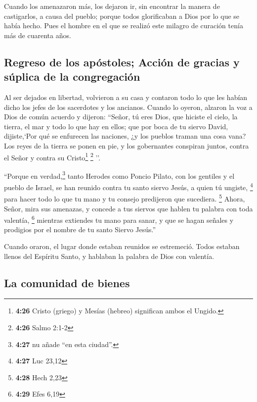  Cuando los amenazaron más, los dejaron ir, sin encontrar
la manera de castigarlos, a causa del pueblo; porque todos glorificaban
a Dios por lo que se había hecho.  Pues el hombre en el
que se realizó este milagro de curación tenía más de cuarenta años.

\hypertarget{regreso-de-los-apuxf3stoles-acciuxf3n-de-gracias-y-suxfaplica-de-la-congregaciuxf3n}{%
\subsection{Regreso de los apóstoles; Acción de gracias y súplica de la
congregación}\label{regreso-de-los-apuxf3stoles-acciuxf3n-de-gracias-y-suxfaplica-de-la-congregaciuxf3n}}

 Al ser dejados en libertad, volvieron a su casa y
contaron todo lo que les habían dicho los jefes de los sacerdotes y los
ancianos.  Cuando lo oyeron, alzaron la voz a Dios de
común acuerdo y dijeron: ``Señor, tú eres Dios, que hiciste el cielo, la
tierra, el mar y todo lo que hay en ellos;  que por boca
de tu siervo David, dijiste,`Por qué se enfurecen las naciones, ¿y los
pueblos traman una cosa vana?  Los reyes de la tierra se
ponen en pie, y los gobernantes conspiran juntos, contra el Señor y
contra su Cristo\footnote{\textbf{4:26} Cristo (griego) y Mesías
  (hebreo) significan ambos el Ungido.} \footnote{\textbf{4:26} Salmo
  2:1-2} ''.

 ``Porque en verdad,\footnote{\textbf{4:27} nu añade ``en
  esta ciudad''.} tanto Herodes como Poncio Pilato, con los gentiles y
el pueblo de Israel, se han reunido contra tu santo siervo Jesús, a
quien tú ungiste, \footnote{\textbf{4:27} Luc 23,12} 
para hacer todo lo que tu mano y tu consejo predijeron que sucediera.
\footnote{\textbf{4:28} Hech 2,23}  Ahora, Señor, mira
sus amenazas, y concede a tus siervos que hablen tu palabra con toda
valentía, \footnote{\textbf{4:29} Efes 6,19}  mientras
extiendes tu mano para sanar, y que se hagan señales y prodigios por el
nombre de tu santo Siervo Jesús.''

 Cuando oraron, el lugar donde estaban reunidos se
estremeció. Todos estaban llenos del Espíritu Santo, y hablaban la
palabra de Dios con valentía.

\hypertarget{la-comunidad-de-bienes}{%
\subsection{La comunidad de bienes}\label{la-comunidad-de-bienes}}

